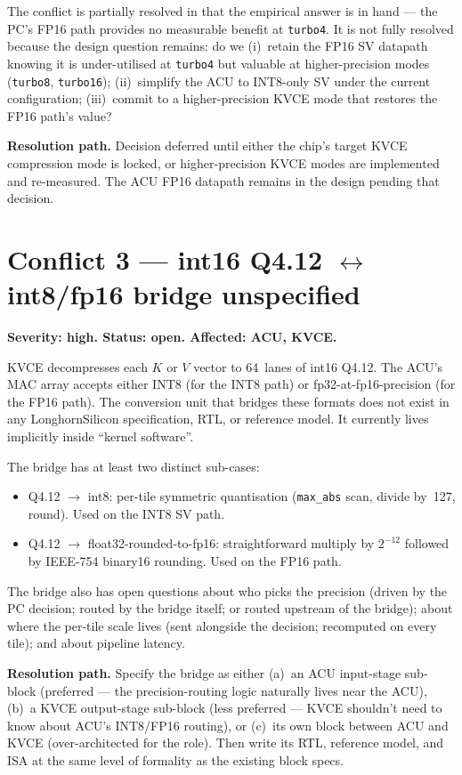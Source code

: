 \documentclass[11pt]{article}
\begin{document}
The conflict is partially resolved in that the empirical answer is
in hand --- the PC's FP16 path provides no measurable benefit at
\texttt{turbo4}. It is not fully resolved because the design question
remains: do we (i)~retain the FP16 SV datapath knowing it is
under-utilised at \texttt{turbo4} but valuable at higher-precision
modes (\texttt{turbo8}, \texttt{turbo16}); (ii)~simplify the ACU to
INT8-only SV under the current configuration; (iii)~commit to a
higher-precision KVCE mode that restores the FP16 path's value?

\textbf{Resolution path.} Decision deferred until either the chip's
target KVCE compression mode is locked, or higher-precision KVCE
modes are implemented and re-measured. The ACU FP16 datapath
remains in the design pending that decision.

\section{Conflict 3 --- int16 Q4.12 $\leftrightarrow$ int8/fp16 bridge unspecified}
\label{sec:c3}

\textbf{Severity: high. Status: open. Affected: ACU, KVCE.}

KVCE decompresses each $K$ or $V$ vector to 64~lanes of int16 Q4.12.
The ACU's MAC array accepts either INT8 (for the INT8 path) or
fp32-at-fp16-precision (for the FP16 path). The conversion unit
that bridges these formats does not exist in any LonghornSilicon
specification, RTL, or reference model. It currently lives
implicitly inside ``kernel software''.

The bridge has at least two distinct sub-cases:

\begin{itemize}
\item Q4.12 $\rightarrow$ int8: per-tile symmetric quantisation
(\texttt{max\_abs} scan, divide by~127, round). Used on the INT8
SV path.
\item Q4.12 $\rightarrow$ float32-rounded-to-fp16: straightforward
multiply by $2^{-12}$ followed by IEEE-754 binary16 rounding. Used
on the FP16 path.
\end{itemize}

The bridge also has open questions about who picks the precision
(driven by the PC decision; routed by the bridge itself; or routed
upstream of the bridge); about where the per-tile scale lives (sent
alongside the decision; recomputed on every tile); and about
pipeline latency.

\textbf{Resolution path.} Specify the bridge as either (a)~an ACU
input-stage sub-block (preferred --- the precision-routing logic
naturally lives near the ACU), (b)~a KVCE output-stage sub-block
(less preferred --- KVCE shouldn't need to know about ACU's
INT8/FP16 routing), or (c)~its own block between ACU and KVCE
(over-architected for the role). Then write its RTL, reference
model, and ISA at the same level of formality as the existing block
specs.
\end{document}
